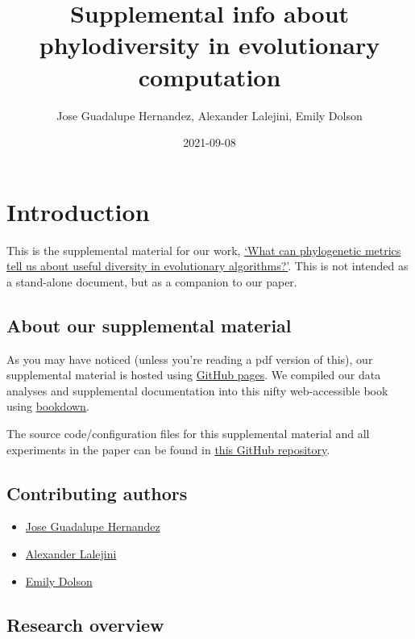 \documentclass[]{book}
\title{Supplemental info about phylodiversity in evolutionary computation}
\author{Jose Guadalupe Hernandez, Alexander Lalejini, Emily Dolson}
\date{2021-09-08}
\providecommand{\tightlist}{%
  \setlength{\itemsep}{0pt}\setlength{\parskip}{0pt}}
\begin{document}
\maketitle

{
\setcounter{tocdepth}{1}
\tableofcontents
}
\hypertarget{introduction}{%
\chapter{Introduction}\label{introduction}}

This is the supplemental material for our work, \href{https://arxiv.org/abs/2108.12586}{`What can phylogenetic metrics tell us about useful diversity in evolutionary algorithms?'}.
This is not intended as a stand-alone document, but as a companion to our paper.

\hypertarget{about-our-supplemental-material}{%
\section{About our supplemental material}\label{about-our-supplemental-material}}

As you may have noticed (unless you're reading a pdf version of this), our supplemental material is hosted using \href{https://pages.github.com/}{GitHub pages}.
We compiled our data analyses and supplemental documentation into this nifty web-accessible book using \href{https://bookdown.org}{bookdown}.

The source code/configuration files for this supplemental material and all experiments in the paper can be found in \href{https://github.com/emilydolson/phylodiversity-metrics-in-EC-GPTP-2021}{this GitHub repository}.

\hypertarget{contributing-authors}{%
\section{Contributing authors}\label{contributing-authors}}

\begin{itemize}
\tightlist
\item
  \href{https://jgh9094.github.io/}{Jose Guadalupe Hernandez}
\item
  \href{https://lalejini.com/}{Alexander Lalejini}
\item
  \href{http://emilyldolson.com/}{Emily Dolson}
\end{itemize}

\hypertarget{research-overview}{%
\section{Research overview}\label{research-overview}}
\end{document}
